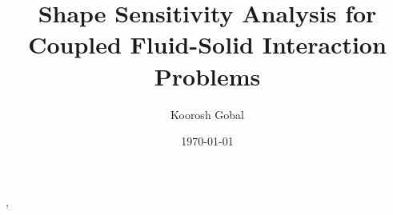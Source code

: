 \documentclass[12pt]{report}
\title{Shape Sensitivity Analysis for Coupled Fluid-Solid Interaction Problems}
\author{Koorosh Gobal}
\date{\today}
\begin{document}
\maketitle
\tableofcontents
\listoffigures
\listoftables
%
%
%
%
%

%

%

,
\end{document}
